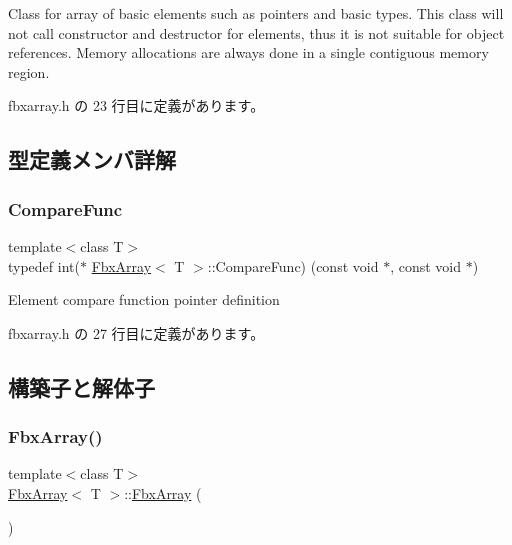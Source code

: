 Class for array of basic elements such as pointers and basic types. This class will not call constructor and destructor for elements, thus it is not suitable for object references. Memory allocations are always done in a single contiguous memory region. 

 fbxarray.\+h の 23 行目に定義があります。



\subsection{型定義メンバ詳解}
\mbox{\label{class_fbx_array_a3f251a5b7314e26facb298dcf3856557}} 
\subsubsection{\texorpdfstring{Compare\+Func}{CompareFunc}}
{\footnotesize\ttfamily template$<$class T$>$ \\
typedef int($\ast$ \hyperlink{class_fbx_array}{Fbx\+Array}$<$ T $>$\+::Compare\+Func) (const void $\ast$, const void $\ast$)}



Element compare function pointer definition 



 fbxarray.\+h の 27 行目に定義があります。



\subsection{構築子と解体子}
\mbox{\label{class_fbx_array_a423ab605db86db1663db8b35043f6f9d}} 
\subsubsection{\texorpdfstring{Fbx\+Array()}{FbxArray()}\hspace{0.1cm}{\footnotesize\ttfamily [1/3]}}
{\footnotesize\ttfamily template$<$class T$>$ \\
\hyperlink{class_fbx_array}{Fbx\+Array}$<$ T $>$\+::\hyperlink{class_fbx_array}{Fbx\+Array} (\begin{DoxyParamCaption}{ }\end{DoxyParamCaption})\hspace{0.3cm}{\ttfamily [inline]}}



